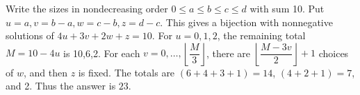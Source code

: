 Write the sizes in nondecreasing order $0\le a\le b\le c\le d$ with sum 10. Put $u=a,v=b-a,w=c-b,z=d-c$. This gives a bijection with nonnegative solutions of $4u+3v+2w+z=10$. For $u=0,1,2$, the remaining total $M=10-4u$ is 10,6,2. For each $v=0,\ldots,\left\lfloor\dfrac{M}{3}\right\rfloor$, there are $\left\lfloor\dfrac{M-3v}{2}\right\rfloor+1$ choices of $w$, and then $z$ is fixed. The totals are $(6+4+3+1)=14$, $(4+2+1)=7$, and 2. Thus the answer is $\boxed{23}$.
